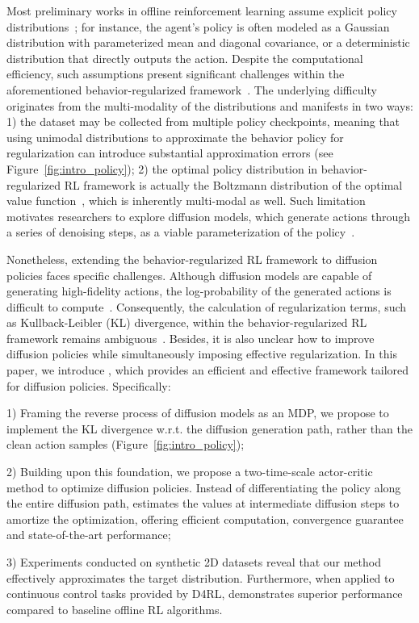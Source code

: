Most preliminary works in offline reinforcement learning assume explicit policy distributions~\citep{td3bc,sac,sacd}; for instance, the agent's policy is often modeled as a Gaussian distribution with parameterized mean and diagonal covariance, or a deterministic distribution that directly outputs the action. Despite the computational efficiency, such assumptions present significant challenges within the aforementioned behavior-regularized framework~\citep{dql,idql,sfbc}. The underlying difficulty originates from the multi-modality of the distributions and manifests in two ways: 1) the dataset may be collected from multiple policy checkpoints, meaning that using unimodal distributions to approximate the behavior policy for regularization can introduce substantial approximation errors (see Figure~\ref{fig:intro_policy}); 2) the optimal policy distribution in behavior-regularized RL framework is actually the Boltzmann distribution of the optimal value function~\cite{sql,awac}, which is inherently multi-modal as well. Such limitation motivates researchers to explore diffusion models, which generate actions through a series of denoising steps, as a viable parameterization of the policy~\citep{dql,idql,srpo,dtql,dac,zhang2024entropy}. 

Nonetheless, extending the behavior-regularized RL framework to diffusion policies faces specific challenges. Although diffusion models are capable of generating high-fidelity actions, the log-probability of the generated actions is difficult to compute~\citep{diffusion_sde}. Consequently, the calculation of regularization terms, such as Kullback-Leibler (KL) divergence, within the behavior-regularized RL framework remains ambiguous~\citep{zhang2024entropy,wang2024diffusion}. Besides, it is also unclear how to improve diffusion policies while simultaneously imposing effective regularization. In this paper, we introduce \algbb, which provides an efficient and effective framework tailored for diffusion policies. Specifically:

1) Framing the reverse process of diffusion models as an MDP, we propose to implement the KL divergence w.r.t. the diffusion generation path, rather than the clean action samples (Figure~\ref{fig:intro_policy}); 

2) Building upon this foundation, we propose a two-time-scale actor-critic method to optimize diffusion policies.  Instead of differentiating the policy along the entire diffusion path, \algbb estimates the values at intermediate diffusion steps to amortize the optimization, offering efficient computation, convergence guarantee and state-of-the-art performance;

3) Experiments conducted on synthetic 2D datasets reveal that our method effectively approximates the target distribution. Furthermore, when applied to continuous control tasks provided by D4RL, \algbb demonstrates superior performance compared to baseline offline RL algorithms. 

